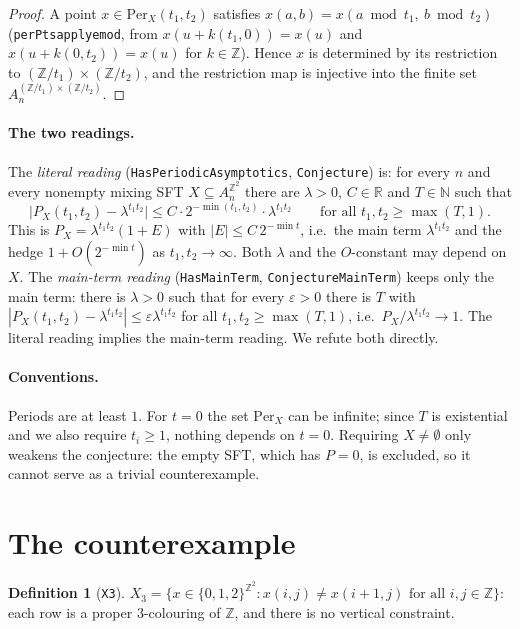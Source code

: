 \documentclass[11pt]{article}
\theoremstyle{definition}
\newtheorem{definition}[theorem]{Definition}
\theoremstyle{remark}
\renewcommand{\_}{\oldus\allowbreak}
\newcommand{\Z}{\mathbb{Z}}
\newcommand{\N}{\mathbb{N}}
\newcommand{\R}{\mathbb{R}}
\newcommand{\Per}{\mathrm{Per}}
\newcommand{\lean}[1]{\texttt{#1}}
\begin{document}
\begin{proof}
A point $x\in\Per_X(t_1,t_2)$ satisfies $x(a,b)=x(a\bmod t_1,\ b\bmod t_2)$
(\lean{perPts\_apply\_emod}, from $x(u+k(t_1,0))=x(u)$ and $x(u+k(0,t_2))=x(u)$ for $k\in\Z$). Hence
$x$ is determined by its restriction to $(\Z/t_1)\times(\Z/t_2)$, and the restriction map is injective
into the finite set $A_n^{(\Z/t_1)\times(\Z/t_2)}$.
\end{proof}

\paragraph{The two readings.} The \emph{literal reading} (\lean{HasPeriodicAsymptotics},
\lean{Conjecture}) is: for every $n$ and every nonempty mixing SFT $X\subseteq A_n^{\Z^2}$ there are
$\lambda>0$, $C\in\R$ and $T\in\N$ such that
\begin{equation}\label{eq:literal}
  \bigl|P_X(t_1,t_2)-\lambda^{t_1t_2}\bigr|\le C\cdot 2^{-\min(t_1,t_2)}\cdot\lambda^{t_1t_2}
  \qquad\text{for all } t_1,t_2\ge\max(T,1).
\end{equation}
This is $P_X=\lambda^{t_1t_2}(1+E)$ with $|E|\le C\,2^{-\min t}$, i.e.\ the main term
$\lambda^{t_1t_2}$ and the hedge $1+O(2^{-\min t})$ as $t_1,t_2\to\infty$. Both $\lambda$ and the
$O$-constant may depend on $X$. The \emph{main-term reading} (\lean{HasMainTerm},
\lean{ConjectureMainTerm}) keeps only the main term: there is $\lambda>0$ such that for every
$\varepsilon>0$ there is $T$ with $|P_X(t_1,t_2)-\lambda^{t_1t_2}|\le\varepsilon\lambda^{t_1t_2}$ for all
$t_1,t_2\ge\max(T,1)$, i.e.\ $P_X/\lambda^{t_1t_2}\to1$. The literal reading implies the main-term
reading. We refute both directly.

\paragraph{Conventions.} Periods are at least $1$. For $t=0$ the set $\Per_X$ can be infinite; since
$T$ is existential and we also require $t_i\ge1$, nothing depends on $t=0$. Requiring $X\neq\emptyset$
only weakens the conjecture: the empty SFT, which has $P=0$, is excluded, so it cannot serve as a
trivial counterexample.

\section{The counterexample}

\begin{definition}[\lean{X3}]
$X_3=\{x\in\{0,1,2\}^{\Z^2} : x(i,j)\neq x(i+1,j)\text{ for all } i,j\in\Z\}$: each row is a proper
$3$-colouring of $\Z$, and there is no vertical constraint.
\end{definition}
\end{document}
